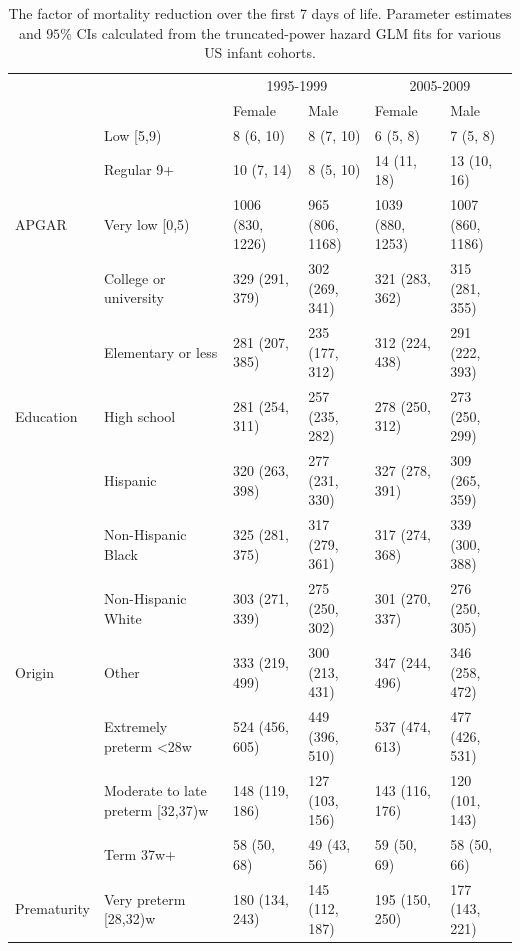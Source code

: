 \documentclass[smallextended]{svjour3} %
\begin{document}
\begin{landscape}\begin{table}[t]

\caption{\label{tab:tab-ci-M}The factor of mortality reduction over the first 7 days of life. Parameter estimates and $95\%$ CIs calculated from the truncated-power hazard GLM fits for various US infant cohorts.}
\centering
\begin{tabular}{llllll}
\toprule
\multicolumn{2}{c}{ } & \multicolumn{2}{c}{1995-1999} & \multicolumn{2}{c}{2005-2009} \\
\cmidrule(l{3pt}r{3pt}){3-4} \cmidrule(l{3pt}r{3pt}){5-6}
 &  & Female & Male & Female & Male\\
\midrule
 & Low [5,9) & 8 (6, 10) & 8 (7, 10) & 6 (5, 8) & 7 (5, 8)\\

 & Regular 9+ & 10 (7, 14) & 8 (5, 10) & 14 (11, 18) & 13 (10, 16)\\

\multirow{-3}{*}{\raggedright\arraybackslash APGAR} & Very low [0,5) & 1006 (830, 1226) & 965 (806, 1168) & 1039 (880, 1253) & 1007 (860, 1186)\\
\cmidrule{1-6}
 & College or university & 329 (291, 379) & 302 (269, 341) & 321 (283, 362) & 315 (281, 355)\\

 & Elementary or less & 281 (207, 385) & 235 (177, 312) & 312 (224, 438) & 291 (222, 393)\\

\multirow{-3}{*}{\raggedright\arraybackslash Education} & High school & 281 (254, 311) & 257 (235, 282) & 278 (250, 312) & 273 (250, 299)\\
\cmidrule{1-6}
 & Hispanic & 320 (263, 398) & 277 (231, 330) & 327 (278, 391) & 309 (265, 359)\\

 & Non-Hispanic Black & 325 (281, 375) & 317 (279, 361) & 317 (274, 368) & 339 (300, 388)\\

 & Non-Hispanic White & 303 (271, 339) & 275 (250, 302) & 301 (270, 337) & 276 (250, 305)\\

\multirow{-4}{*}{\raggedright\arraybackslash Origin} & Other & 333 (219, 499) & 300 (213, 431) & 347 (244, 496) & 346 (258, 472)\\
\cmidrule{1-6}
 & Extremely preterm <28w & 524 (456, 605) & 449 (396, 510) & 537 (474, 613) & 477 (426, 531)\\

 & Moderate to late preterm [32,37)w & 148 (119, 186) & 127 (103, 156) & 143 (116, 176) & 120 (101, 143)\\

 & Term 37w+ & 58 (50, 68) & 49 (43, 56) & 59 (50, 69) & 58 (50, 66)\\

\multirow{-4}{*}{\raggedright\arraybackslash Prematurity} & Very preterm [28,32)w & 180 (134, 243) & 145 (112, 187) & 195 (150, 250) & 177 (143, 221)\\
\bottomrule
\end{tabular}
\end{table}
\end{landscape}
\end{document}
